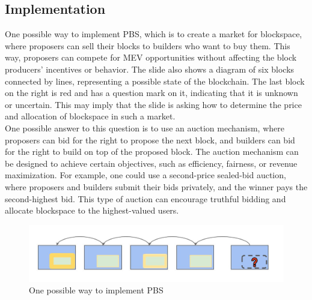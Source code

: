 \documentclass{report}
\begin{document}
 \subsection{Implementation}
 One possible way to implement PBS, which is to create a market for blockspace, where proposers can sell their blocks to builders who want to buy them. This way, proposers can compete for MEV opportunities without affecting the block producers’ incentives or behavior. The slide also shows a diagram of six blocks connected by lines, representing a possible state of the blockchain. The last block on the right is red and has a question mark on it, indicating that it is unknown or uncertain. This may imply that the slide is asking how to determine the price and allocation of blockspace in such a market.\\
 One possible answer to this question is to use an auction mechanism, where proposers can bid for the right to propose the next block, and builders can bid for the right to build on top of the proposed block. The auction mechanism can be designed to achieve certain objectives, such as efficiency, fairness, or revenue maximization. For example, one could use a second-price sealed-bid auction, where proposers and builders submit their bids privately, and the winner pays the second-highest bid. This type of auction can encourage truthful bidding and allocate blockspace to the highest-valued users.
\begin{center}
 	\begin{figure}
 		\centering
 		\includegraphics[width=0.8\linewidth]{Fig/F3}
 		\caption{One possible way to implement PBS}
 		\label{fig:f3}
 	\end{figure}
\end{center}
\end{document}
